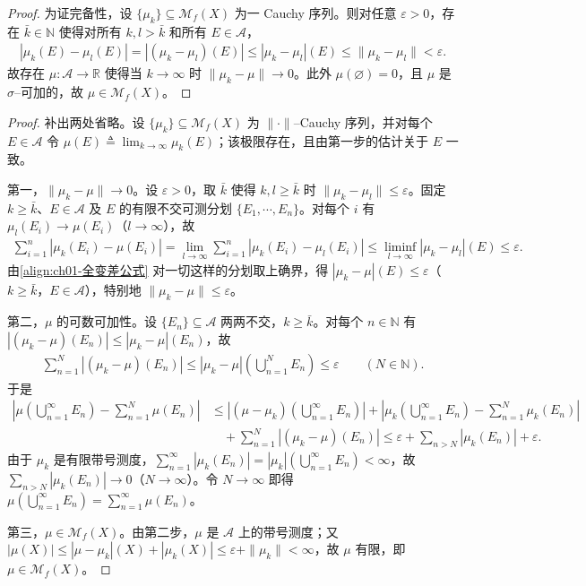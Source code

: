 \documentclass[../../main.tex]{subfiles}%
\begin{document}
\begin{proof}
为证完备性，设 $\{\mu_k\}\subseteq\mathcal{M}_f(X)$ 为一 Cauchy 序列。则对任意 $\varepsilon>0$，存在 $\bar{k}\in\mathbb{N}$ 使得对所有 $k,l>\bar{k}$ 和所有 $E\in\mathcal{A}$，
\begin{align*}
|\mu_k(E)-\mu_l(E)|=|(\mu_k-\mu_l)(E)|\leqslant|\mu_k-\mu_l|(E)\leqslant\|\mu_k-\mu_l\|<\varepsilon.
\end{align*}
故存在 $\mu:\mathcal{A}\to\mathbb{R}$ 使得当 $k\to\infty$ 时 $\|\mu_k-\mu\|\to0$。此外 $\mu(\varnothing)=0$，且 $\mu$ 是 $\sigma$--可加的，故 $\mu\in\mathcal{M}_f(X)$。
\end{proof}
\begin{proof}
补出两处省略。设 $\{\mu_k\}\subseteq\mathcal{M}_f(X)$ 为 $\|\cdot\|$--Cauchy 序列，并对每个 $E\in\mathcal{A}$ 令 $\mu(E)\triangleq\lim_{k\to\infty}\mu_k(E)$；该极限存在，且由第一步的估计关于 $E$ 一致。

第一，$\|\mu_k-\mu\|\to0$。设 $\varepsilon>0$，取 $\bar{k}$ 使得 $k,l\geqslant\bar{k}$ 时 $\|\mu_k-\mu_l\|\leqslant\varepsilon$。固定 $k\geqslant\bar{k}$、$E\in\mathcal{A}$ 及 $E$ 的有限不交可测分划 $\{E_1,\cdots,E_n\}$。对每个 $i$ 有 $\mu_l(E_i)\to\mu(E_i)$（$l\to\infty$），故
\begin{align*}
\sum_{i=1}^n|\mu_k(E_i)-\mu(E_i)|
=\lim_{l\to\infty}\sum_{i=1}^n|\mu_k(E_i)-\mu_l(E_i)|
\leqslant\liminf_{l\to\infty}|\mu_k-\mu_l|(E)\leqslant\varepsilon .
\end{align*}
由\eqref{align:ch01-全变差公式} 对一切这样的分划取上确界，得 $|\mu_k-\mu|(E)\leqslant\varepsilon$（$k\geqslant\bar{k}$，$E\in\mathcal{A}$），特别地 $\|\mu_k-\mu\|\leqslant\varepsilon$。

第二，$\mu$ 的可数可加性。设 $\{E_n\}\subseteq\mathcal{A}$ 两两不交，$k\geqslant\bar{k}$。对每个 $n\in\mathbb{N}$ 有 $|(\mu_k-\mu)(E_n)|\leqslant|\mu_k-\mu|(E_n)$，故
\begin{align*}
\sum_{n=1}^N|(\mu_k-\mu)(E_n)|\leqslant|\mu_k-\mu|\left(\bigcup_{n=1}^N E_n\right)\leqslant\varepsilon\qquad(N\in\mathbb{N}).
\end{align*}
于是
\begin{align*}
\left|\mu\left(\bigcup_{n=1}^\infty E_n\right)-\sum_{n=1}^N\mu(E_n)\right|
&\leqslant\left|(\mu-\mu_k)\left(\bigcup_{n=1}^\infty E_n\right)\right|
+\left|\mu_k\left(\bigcup_{n=1}^\infty E_n\right)-\sum_{n=1}^N\mu_k(E_n)\right|\\
&\quad+\sum_{n=1}^N|(\mu_k-\mu)(E_n)|
\leqslant\varepsilon+\sum_{n>N}|\mu_k(E_n)|+\varepsilon .
\end{align*}
由于 $\mu_k$ 是有限带号测度，$\sum_{n=1}^\infty|\mu_k(E_n)|=|\mu_k|\left(\bigcup_{n=1}^\infty E_n\right)<\infty$，故 $\sum_{n>N}|\mu_k(E_n)|\to0$（$N\to\infty$）。令 $N\to\infty$ 即得 $\mu\left(\bigcup_{n=1}^\infty E_n\right)=\sum_{n=1}^\infty\mu(E_n)$。

第三，$\mu\in\mathcal{M}_f(X)$。由第二步，$\mu$ 是 $\mathcal{A}$ 上的带号测度；又 $|\mu(X)|\leqslant|\mu-\mu_k|(X)+|\mu_k(X)|\leqslant\varepsilon+\|\mu_k\|<\infty$，故 $\mu$ 有限，即 $\mu\in\mathcal{M}_f(X)$。
\end{proof}
\end{document}
